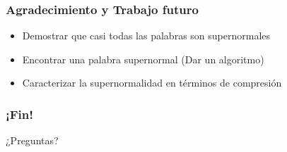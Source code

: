 \documentclass[10pt,mathserif]{beamer}%
\begin{document}
      


  
      

\begin{frame}
  \frametitle{Agradecimiento y Trabajo futuro}
  \begin{itemize}
    \item Demostrar que casi todas las palabras son supernormales
    \item Encontrar una palabra supernormal (Dar un algoritmo)
    \item Caracterizar la supernormalidad en términos de compresión
  \end{itemize}
\end{frame}

\begin{frame}
  \frametitle{¡Fin!}
  \begin{center}
  {\Huge ¿Preguntas?}
  \end{center}
\end{frame}
  
\end{document}
